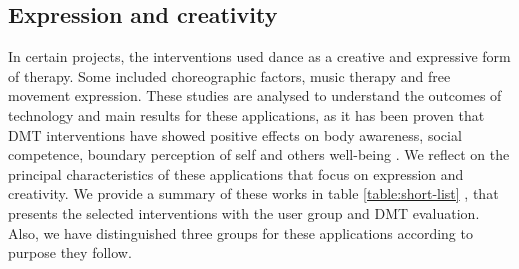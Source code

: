 \documentclass[a4paper,fleqn]{cas-sc}
\begin{document}
\subsection{Expression and creativity}
\label{sec:4-express}
In certain projects, the interventions used dance as a creative and expressive form of therapy. Some included choreographic factors, music therapy and free movement expression. These studies are analysed to understand the outcomes of technology and main results for these applications, as it has been proven that DMT interventions have showed positive effects on body awareness, social competence, boundary perception of self and others well-being \cite{Koch23}. We reflect on the principal characteristics of these applications that focus on expression and creativity. We provide a summary of these works in table \ref{table:short-list} , that presents the selected interventions with the user group and DMT evaluation. Also, we have distinguished three groups for these applications according to purpose they follow.
\end{document}
